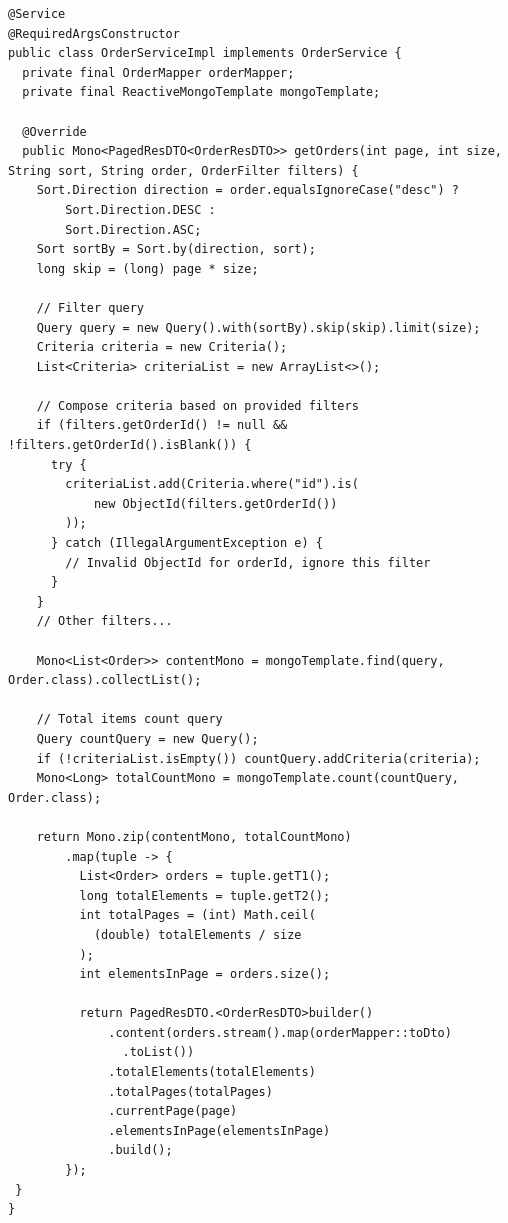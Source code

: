 \begin{lstlisting}[language=JavaExtended, caption={Spring Boot ReactiveMongoTemplate Dynamic Query}, label={lst:spring_dynamic_query}]
@Service
@RequiredArgsConstructor
public class OrderServiceImpl implements OrderService {
  private final OrderMapper orderMapper;
  private final ReactiveMongoTemplate mongoTemplate;

  @Override
  public Mono<PagedResDTO<OrderResDTO>> getOrders(int page, int size, String sort, String order, OrderFilter filters) {
    Sort.Direction direction = order.equalsIgnoreCase("desc") ?
        Sort.Direction.DESC :
        Sort.Direction.ASC;
    Sort sortBy = Sort.by(direction, sort);
    long skip = (long) page * size;

    // Filter query
    Query query = new Query().with(sortBy).skip(skip).limit(size);
    Criteria criteria = new Criteria();
    List<Criteria> criteriaList = new ArrayList<>();

    // Compose criteria based on provided filters
    if (filters.getOrderId() != null && !filters.getOrderId().isBlank()) {
      try {
        criteriaList.add(Criteria.where("id").is(
            new ObjectId(filters.getOrderId())
        ));
      } catch (IllegalArgumentException e) {
        // Invalid ObjectId for orderId, ignore this filter
      }
    }
    // Other filters...

    Mono<List<Order>> contentMono = mongoTemplate.find(query, Order.class).collectList();

    // Total items count query
    Query countQuery = new Query();
    if (!criteriaList.isEmpty()) countQuery.addCriteria(criteria);
    Mono<Long> totalCountMono = mongoTemplate.count(countQuery, Order.class);

    return Mono.zip(contentMono, totalCountMono)
        .map(tuple -> {
          List<Order> orders = tuple.getT1();
          long totalElements = tuple.getT2();
          int totalPages = (int) Math.ceil(
            (double) totalElements / size
          );
          int elementsInPage = orders.size();

          return PagedResDTO.<OrderResDTO>builder()
              .content(orders.stream().map(orderMapper::toDto)
                .toList())
              .totalElements(totalElements)
              .totalPages(totalPages)
              .currentPage(page)
              .elementsInPage(elementsInPage)
              .build();
        });
 }
}
\end{lstlisting}

